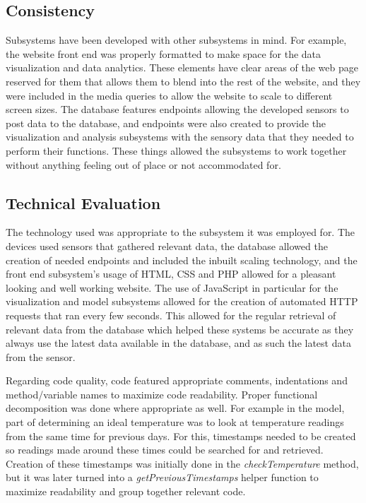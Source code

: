 \documentclass[]{report}
\begin{document}
	\subsection{Consistency}
	Subsystems have been developed with other subsystems in mind. For example, the website front end was properly formatted to make space for the data visualization and data analytics. These elements have clear areas of the web page reserved for them that allows them to blend into the rest of the website, and they were included in the media queries to allow the website to scale to different screen sizes. The database features endpoints allowing the developed sensors to post data to the database, and endpoints were also created to provide the visualization and analysis subsystems with the sensory data that they needed to perform their functions. These things allowed the subsystems to work together without anything feeling out of place or not accommodated for.
	
	\subsection{Technical Evaluation}
	The technology used was appropriate to the subsystem it was employed for. The devices used sensors that gathered relevant data, the database allowed the creation of needed endpoints and included the inbuilt scaling technology, and the front end subsystem's usage of HTML, CSS and PHP allowed for a pleasant looking and well working website. The use of JavaScript in particular for the visualization and model subsystems allowed for the creation of automated HTTP requests that ran every few seconds. This allowed for the regular retrieval of relevant data from the database which helped these systems be accurate as they always use the latest data available in the database, and as such the latest data from the sensor.
	
	Regarding code quality, code featured appropriate comments, indentations and method/variable names to maximize code readability. Proper functional decomposition was done where appropriate as well. For example in the model, part of determining an ideal temperature was to look at temperature readings from the same time for previous days. For this, timestamps needed to be created so readings made around these times could be searched for and retrieved. Creation of these timestamps was initially done in the \textit{checkTemperature} method, but it was later turned into a \textit{getPreviousTimestamps} helper function to maximize readability and group together relevant code.
	
\end{document}
